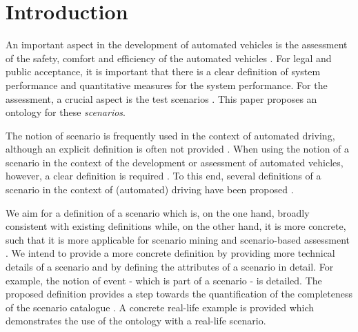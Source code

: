 \section{Introduction}
\label{sec:introduction}

An important aspect in the development of automated vehicles is the assessment of the safety, comfort and efficiency of the automated vehicles \cite{bengler2014threedecades, stellet2015taxonomy, Helmer2017safety, putz2017pegasus, roesener2017comprehensive, gietelink2006development}. For legal and public acceptance, it is important that there is a clear definition of system performance and quantitative measures for the system performance. For the assessment, a crucial aspect is the test scenarios \cite{stellet2015taxonomy}. This paper proposes an ontology for these \emph{scenarios}.

The notion of scenario is frequently used in the context of automated driving, although an explicit definition is often not provided \cite{putz2017pegasus, roesener2017comprehensive, gietelink2006development, hulshof2013autonomous, karaduman2013interactivebehavior, englund2016grand, xu2002effects, ebner2011identifying, ploeg2017GCDC, zofka2015datadrivetrafficscenarios}. When using the notion of a scenario in the context of the development or assessment of automated vehicles, however, a clear definition is required \cite{stellet2015taxonomy, Helmer2017safety, alvarez2017prospective, zofka2015datadrivetrafficscenarios, aparicio2013pre, lesemann2011test, putz2017pegasus, geyer2014, ulbrich2015}. To this end, several definitions of a scenario in the context of (automated) driving have been proposed \cite{geyer2014, ulbrich2015, elrofai2016scenario}.

We aim for a definition of a scenario which is, on the one hand, broadly consistent with existing definitions \cite{geyer2014, ulbrich2015, elrofai2016scenario} while, on the other hand, it is more concrete, such that it is more applicable for scenario mining \cite{elrofai2016scenario} and scenario-based assessment \cite{stellet2015taxonomy, deGelder2017assessment}. We intend to provide a more concrete definition by providing more technical details of a scenario and by defining the attributes of a scenario in detail. For example, the notion of event - which is part of a scenario - is detailed. The proposed definition provides a step towards the quantification of the completeness of the scenario catalogue \cite{geyer2014, alvarez2017prospective, stellet2015taxonomy}. A concrete real-life example is provided which demonstrates the use of the ontology with a real-life scenario.

